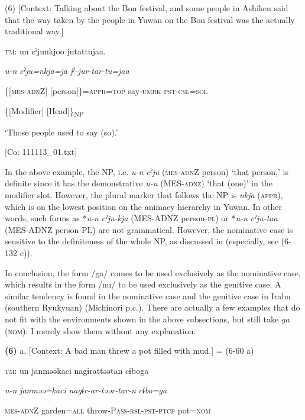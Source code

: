 (6)  [Context: Talking about the Bon festival, and some people in Ashiken said that the way taken by the people in Yuwan on the Bon festival was the actually traditional way.]

  \textsc{tm}:  un  cˀjunkjoo  jutattujaa.

    \textit{u-n}  \textit{cˀju=nkja=ja}  \textit{jˀ-jur-tar-tu=jaa}

    \{[\textsc{mes}-\textsc{adn}Z]  [person]\}=\textsc{appr}=\textsc{top}  say-\textsc{umrk}-\textsc{pst}-\textsc{csl}=\textsc{sol}

    \{[Modifier]  [Head]\}\textsubscript{NP}  

    ‘Those people used to say (so).’

    [Co: 111113\_01.txt]

In the above example, the NP, i.e. \textit{u-n} \textit{cˀju} (\textsc{mes}-\textsc{adn}Z person) ‘that person,’ is definite since it has the demonstrative \textit{u-n} (MES-\textsc{adnz}) ‘that (one)’ in the modifier slot. However, the plural marker that follows the NP is \textit{nkja} (\textsc{appr}), which is on the lowest position on the animacy hierarchy in Yuwan. In other words, such forms as *\textit{u-n} \textit{cˀju-kja} (MES-ADNZ person-\textsc{pl}) or *\textit{u-n} \textit{cˀju-taa} (MES-ADNZ person-PL) are not grammatical. However, the nominative case is sensitive to the definiteness of the whole NP, as discussed in  (especially, see (6-132 c)).

  In conclusion, the form /ga/ comes to be used exclusively as the nominative case, which results in the form /nu/ to be used exclusively as the genitive case. A similar tendency is found in the nominative case and the genitive case in Irabu (southern Ryukyuan) (Michinori \citealt{Shimoji2013} p.c.). There are actually a few examples that do not fit with the environments shown in the above subsections, but still take \textit{ga} (\textsc{nom}). I merely show them without any explanation.

\textbf{(6)}  a.  [Context: A bad man threw a pot filled with mud.] = (6-60 a)

    \textsc{tm}:  un  janməəkaci  nagɨrattəətan  cɨboga

      \textit{u-n}  \textit{janməə=kaci}  \textit{nagɨr-ar-təər-tar-n}  \textit{cɨbo=ga}

      \textsc{mes}-\textsc{adn}Z  garden=\textsc{all}  throw-P\textsc{ass}-\textsc{rsl}-\textsc{pst}-\textsc{ptcp}  pot=\textsc{nom}

